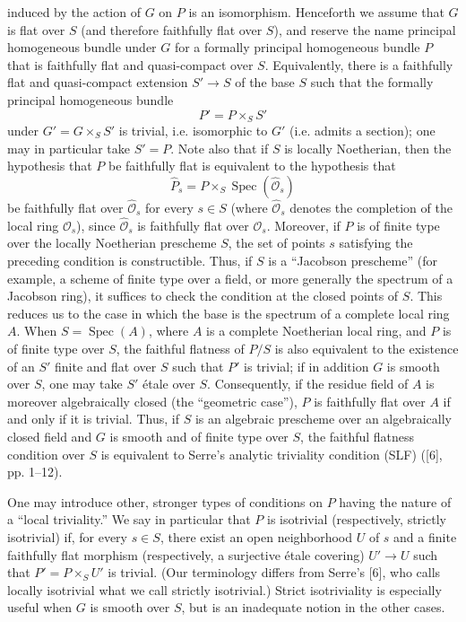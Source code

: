 induced by the action of $G$ on $P$ is an isomorphism. Henceforth we assume
that $G$ is flat over $S$ (and therefore faithfully flat over $S$), and reserve
the name principal homogeneous bundle under $G$ for a formally principal
homogeneous bundle $P$ that is faithfully flat and quasi-compact over $S$.
Equivalently, there is a faithfully flat and quasi-compact extension
$S'\longrightarrow S$ of the base $S$ such that the formally principal
homogeneous bundle
\[
  P'=P\times_SS'
\]
under $G'=G\times_SS'$ is trivial, i.e. isomorphic to $G'$ (i.e. admits a
section); one may in particular take $S'=P$. Note also that if $S$ is locally
Noetherian, then the hypothesis that $P$ be faithfully flat is equivalent to
the hypothesis that
\[
  \widehat P_s=P\times_S\operatorname{Spec}(\widehat{\mathcal O}_s)
\]
be faithfully flat over $\widehat{\mathcal O}_s$ for every $s\in S$ (where
$\widehat{\mathcal O}_s$ denotes the completion of the local ring
$\mathcal O_s$), since $\widehat{\mathcal O}_s$ is faithfully flat over
$\mathcal O_s$. Moreover, if $P$ is of finite type over the locally Noetherian
prescheme $S$, the set of points $s$ satisfying the preceding condition is
constructible. Thus, if $S$ is a “Jacobson prescheme” (for example, a scheme
of finite type over a field, or more generally the spectrum of a Jacobson
ring), it suffices to check the condition at the closed points of $S$. This
reduces us to the case
in which the base is the spectrum of a complete local ring $A$. When
$S=\operatorname{Spec}(A)$, where $A$ is a complete Noetherian local ring, and
$P$ is of finite type over $S$, the faithful flatness of $P/S$ is also
equivalent to the existence of an $S'$ finite and flat over $S$ such that $P'$
is trivial; if in addition $G$ is smooth over $S$, one may take $S'$ étale
over $S$. Consequently, if the residue field of $A$ is moreover algebraically
closed (the “geometric case”), $P$ is faithfully flat over $A$ if and only if
it is trivial. Thus, if $S$ is an algebraic prescheme over an algebraically
closed field and $G$ is smooth and of finite type over $S$, the faithful
flatness condition over $S$ is equivalent to Serre's analytic triviality
condition (SLF) ([6], pp. 1--12).

One may introduce other, stronger types of conditions on $P$ having the nature
of a “local triviality.” We say in particular that $P$ is isotrivial
(respectively, strictly isotrivial) if, for every $s\in S$, there exist an open
neighborhood $U$ of $s$ and a finite faithfully flat morphism (respectively, a
surjective étale covering) $U'\longrightarrow U$ such that
$P'=P\times_SU'$ is trivial. (Our terminology differs from Serre's [6], who
calls locally isotrivial what we call strictly isotrivial.) Strict
isotriviality is especially useful when $G$ is smooth over $S$, but is an
inadequate notion in the other cases.

